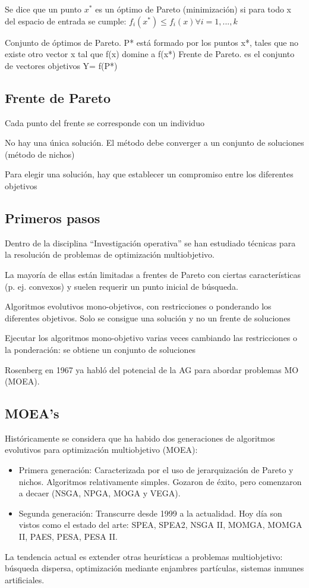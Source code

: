 \documentclass[12pt, twoside, openright]{report} %
\begin{document}
Se dice que un punto $x^*$ es un óptimo de Pareto (minimización) si para todo x del espacio de entrada se cumple: $f_i(x^*) \leq f_i(x) \forall i = 1, ..., k$

Conjunto de óptimos de Pareto. P* está formado por los puntos x*, tales que no existe otro vector x tal que f(x) domine a f(x*) Frente de Pareto. es el conjunto de vectores objetivos Y= f(P*)

\subsection{Frente de Pareto}
Cada punto del frente se corresponde con un individuo

No hay una única solución. El método debe converger a un conjunto de soluciones (método de nichos)

Para elegir una solución, hay que establecer un compromiso entre los diferentes objetivos

\subsection{Primeros pasos}
Dentro de la disciplina “Investigación operativa” se han estudiado técnicas para la resolución de problemas de optimización multiobjetivo.

La mayoría de ellas están limitadas a frentes de Pareto con ciertas características (p. ej. convexos) y suelen requerir un punto inicial de búsqueda.

Algoritmos evolutivos mono-objetivos, con restricciones o ponderando los diferentes objetivos. Solo se consigue una solución y no un frente de soluciones

Ejecutar los algoritmos mono-objetivo varias veces cambiando las restricciones o la ponderación: se obtiene un conjunto de soluciones

Rosenberg en 1967 ya habló del potencial de la AG para abordar problemas MO (MOEA).

\subsection{MOEA’s}
Históricamente se considera que ha habido dos generaciones de algoritmos evolutivos para optimización multiobjetivo (MOEA):
\begin{itemize}
	\item Primera generación: Caracterizada por el uso de jerarquización de Pareto y nichos. Algoritmos relativamente simples. Gozaron de éxito, pero comenzaron a decaer (NSGA, NPGA, MOGA y VEGA).
	\item Segunda generación: Transcurre desde 1999 a la actualidad. Hoy día son vistos como el estado del arte: SPEA, SPEA2, NSGA II, MOMGA, MOMGA II, PAES, PESA, PESA II.
\end{itemize} 
La tendencia actual es extender otras heurísticas a problemas multiobjetivo: búsqueda dispersa, optimización mediante enjambres partículas, sistemas inmunes artificiales.
\end{document}
